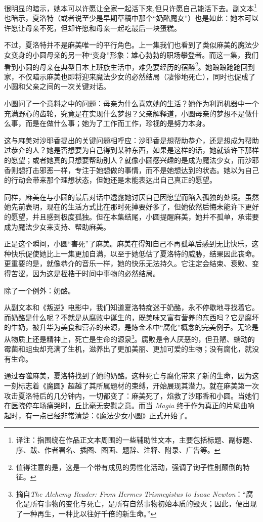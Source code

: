 很明显的暗示，她本可以许愿让全家一起活下来,但只许愿自己能活下去。副文本\footnote{译注：指围绕在作品正文本周围的一些辅助性文本，主要包括标题、副标题、序、跋、作者署名、插图、图画、题辞、注释、附录、广告等。}也暗示，夏洛特（或者说至少是早期草稿中那个“奶酪魔女”）也是如此：她本可以许愿让母亲不死，但却许愿和母亲一起吃最后一块蛋糕\cite{ref26}。

不过，夏洛特并不是麻美唯一的平行角色。上一集我们也看到了类似麻美的魔法少女变身的小圆母亲的另一种“变身”形象：雄心勃勃的职场攀登者。而这一集，我们看到小圆的母亲在典型日本上班族生活中，难免要经历的宿醉\footnote{值得注意的是，这是一个带有成见的男性化活动，强调了询子性别颠倒的特征。}\cite{ref27}。她踉踉跄跄回到家，不仅暗示麻美也即将迎来魔法少女的必然结局（凄惨地死亡），同时也促成了小圆和父亲之间的一次关键对话。

小圆问了一个意料之中的问题：母亲为什么喜欢她的生活？她作为利润机器中一个充满野心的齿轮，究竟是在实现什么梦想？父亲解释道，小圆母亲的梦想不是做什么事，而是在做什么事；她为了工作而工作，珍视的是努力本身。

这与麻美对沙耶香提出的关键问题相呼应：沙耶香是想帮助恭介，还是想成为帮助过恭介的人？她是否想要为自己得到某种东西，如果是这样的话，她就该许下那样的愿望；或者她真的只想要帮助别人？就像小圆感兴趣的是成为魔法少女，而沙耶香则想打击邪恶一样，专注于她想做的事情，而不是她想达到的状态。她以为自己的行动会带来那个理想状态，但她还是未能表达出自己真正的愿望。

同样，麻美在与小圆的最后对话中透露她讨厌自己因愿望而陷入孤独的处境。虽然她先前表明，现在的生活方式比在那时死掉要好多了，但她依然后悔未能许下更好的愿望，并且感到极度孤独。但在本集结尾，小圆提醒麻美，她并不孤单，承诺要成为魔法少女来支持、帮助麻美。

正是这个瞬间，小圆“害死”了麻美。麻美在得知自己不再孤单后感到无比快乐，这种快乐促使她比上一集更加自满，以至于她低估了夏洛特的威胁，结果因此丧命。更重要的是，就像恭介的音乐一样，她的快乐无法持久。它注定会结束、衰败、变得苦涩，因为这是桎梏于时间中事物的必然结局。

除了一个例外：奶酪。

从副文本和《叛逆》电影中，我们知道夏洛特痴迷于奶酪，永不停歇地寻找着它。而奶酪是什么呢？不就是从腐败中诞生的，既美味又富有营养的东西吗？它是腐坏的牛奶，被升华为美食和营养的来源，是炼金术中“腐化”概念的完美例子。无论是从物质上还是精神上，死亡是生命的源泉\footnote{摘自\emph{The Alchemy Reader: From Hermes Trismegistus to Isaac Newton}：“腐化是所有事物的变化与死亡，是所有自然事物初始本质的毁灭；因此，便出现了一种再生，一种比以往好千倍的新生命。”}\cite{ref28}。腐败是令人厌恶的，但丑陋、蠕动的霉菌和蛆虫却充满了生机，滋养出了更加美丽、更加可爱的生物；没有腐化，就没有生命。

通过吞噬麻美，夏洛特找到了她的奶酪。这种死亡与腐化带来了新的生命，因为这一刻标志着《魔圆》超越了其所属题材的束缚，开始展现其潜力。就在麻美第一次攻击夏洛特后的几分钟内，一切都变了：麻美死了，焰救了沙耶香和小圆。当她们在医院停车场痛哭时，丘比毫无安慰之意。而当 \emph{Magia} 终于作为真正的片尾曲响起时，有一点已经非常清楚：《魔法少女小圆》正式开始了。
